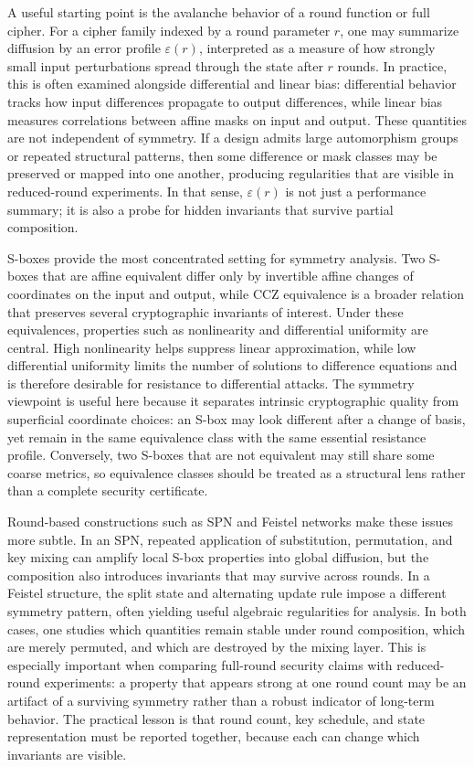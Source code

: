 \documentclass[11pt]{article}
\begin{document}
A useful starting point is the avalanche behavior of a round function or full cipher. For a cipher family indexed by a round parameter $r$, one may summarize diffusion by an error profile $\varepsilon(r)$, interpreted as a measure of how strongly small input perturbations spread through the state after $r$ rounds. In practice, this is often examined alongside differential and linear bias: differential behavior tracks how input differences propagate to output differences, while linear bias measures correlations between affine masks on input and output. These quantities are not independent of symmetry. If a design admits large automorphism groups or repeated structural patterns, then some difference or mask classes may be preserved or mapped into one another, producing regularities that are visible in reduced-round experiments. In that sense, $\varepsilon(r)$ is not just a performance summary; it is also a probe for hidden invariants that survive partial composition.

S-boxes provide the most concentrated setting for symmetry analysis. Two S-boxes that are affine equivalent differ only by invertible affine changes of coordinates on the input and output, while CCZ equivalence is a broader relation that preserves several cryptographic invariants of interest. Under these equivalences, properties such as nonlinearity and differential uniformity are central. High nonlinearity helps suppress linear approximation, while low differential uniformity limits the number of solutions to difference equations and is therefore desirable for resistance to differential attacks. The symmetry viewpoint is useful here because it separates intrinsic cryptographic quality from superficial coordinate choices: an S-box may look different after a change of basis, yet remain in the same equivalence class with the same essential resistance profile. Conversely, two S-boxes that are not equivalent may still share some coarse metrics, so equivalence classes should be treated as a structural lens rather than a complete security certificate.

Round-based constructions such as SPN and Feistel networks make these issues more subtle. In an SPN, repeated application of substitution, permutation, and key mixing can amplify local S-box properties into global diffusion, but the composition also introduces invariants that may survive across rounds. In a Feistel structure, the split state and alternating update rule impose a different symmetry pattern, often yielding useful algebraic regularities for analysis. In both cases, one studies which quantities remain stable under round composition, which are merely permuted, and which are destroyed by the mixing layer. This is especially important when comparing full-round security claims with reduced-round experiments: a property that appears strong at one round count may be an artifact of a surviving symmetry rather than a robust indicator of long-term behavior. The practical lesson is that round count, key schedule, and state representation must be reported together, because each can change which invariants are visible.
\end{document}
